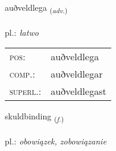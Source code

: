 \documentclass[frontgrid, backgrid]{flacards}\usepackage[]{graphicx}\usepackage[]{xcolor}
\begin{document}
\renewcommand{\flhead}{\vskip5pt \fboxsep=0pt {\small\bfseries\footnotesize Atviksorð | przysłówek}}
\renewcommand{\fcfoot}{\vskip5pt \fboxsep=0pt \hspace{2pt}{\small\bfseries\footnotesize 3K}}

\renewcommand{\blhead}{\vskip5pt {\small\bfseries\footnotesize Atviksorð | przysłówek }}
\renewcommand{\bcfoot}{\vskip5pt \hspace{2pt}{\small\bfseries\footnotesize 3K}}


{auðveldlega \small{\textsubscript{(\textit{adv.})}} \\[1ex] %
\textphonetic{[œiðvɛltlɛɣa]} \\
pl.: \emph{łatwo} \\  [2ex]
\renewcommand*{\arraystretch}{0.8}
\begin{tabular}{ll}
\textsc{pos}: & auðveldlega \\ 
\textsc{comp.}: & auðveldlegar \\ 
\textsc{superl.}: & auðveldlegast \\
\end{tabular}
}

\renewcommand{\flhead}{\vskip5pt \fboxsep=0pt {\small\bfseries\footnotesize Nafnorð | rzeczownik}}
\renewcommand{\fcfoot}{\vskip5pt \fboxsep=0pt \hspace{2pt}{\small\bfseries\footnotesize 3K}}

\renewcommand{\blhead}{\vskip5pt {\small\bfseries\footnotesize Nafnorð | rzeczownik }}
\renewcommand{\bcfoot}{\vskip5pt \hspace{2pt}{\small\bfseries\footnotesize 3K}}


{skuldbinding \small{\textsubscript{(\textit{f.})}} \\[1ex] %
\textphonetic{[skʏltpɪntiŋk]} \\
pl.: \emph{obowiązek, zobowiązanie} \\  [2ex]
\renewcommand*{\arraystretch}{0.8}
}
\end{document}
